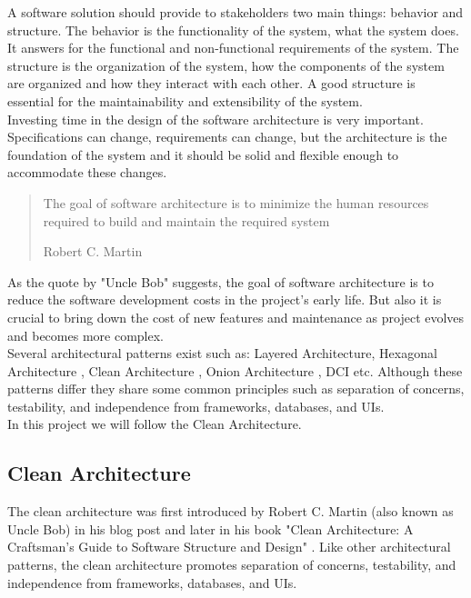 \begin{spacing}{1.2}
    A software solution should provide to stakeholders two main things: behavior and structure.
    The behavior is the functionality of the system, what the system does. It answers for the functional and non-functional requirements of the system.
    The structure is the organization of the system, how the components of the system are organized and how they interact with each other.
    A good structure is essential for the maintainability and extensibility of the system.
    \\

    Investing time in the design of the software architecture is very important. Specifications can change, requirements can change, but the architecture is the foundation of the system and
    it should be solid and flexible enough to accommodate these changes.
    \begin{quote}
        The goal of software architecture is to minimize the human resources required to build and maintain the required system
        \begin{flushright}
            Robert C. Martin \cite{clean}
        \end{flushright}

    \end{quote}

    As the quote by "Uncle Bob" suggests, the goal of software architecture is to reduce the software development costs in the project's early life. But also it is
    crucial to bring down the cost of new features and maintenance as project evolves and becomes more complex.
    \\

    Several architectural patterns exist such as: Layered Architecture, Hexagonal Architecture \cite{freeman2009growing}, Clean Architecture \cite{clean}, Onion Architecture \cite{Onion}, DCI \cite{dci} etc.
    Although these patterns differ they share some common principles such as separation of concerns, testability, and independence from frameworks, databases, and UIs.
    \\

    In this project we will follow the Clean Architecture.


    \subsection{Clean Architecture}
    The clean architecture was first introduced by Robert C. Martin (also known as Uncle Bob)
    in his blog post \cite{cleanBlog} and later in his book "Clean Architecture: A Craftsman's Guide to Software Structure and
    Design" \cite{clean}. Like other architectural patterns, the clean architecture promotes
    separation of concerns, testability, and independence from frameworks, databases, and UIs.


\end{spacing}
